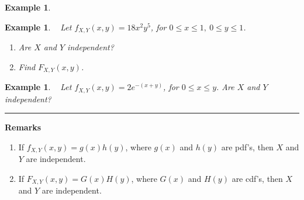 \documentclass[12pt]{amsart}
\newtheorem{example}[theorem]{Example}
\newcommand\pdfXY{f_{X,Y}(x,y)}
\newcommand\cdfXY{F_{X,Y}(x,y)}
\begin{document}
{\begin{example}
\begin{enumerate}
\end{enumerate}

\end{example}



\newpage

\begin{example}\ %
Let $\pdfXY = 18 x^2 y^5$, for $0 \leq x \leq 1, \ 0 \leq y \leq 1$.

\vspace{.5cm}

\begin{enumerate}
\item Are $X$ and $Y$ independent?
\vspace{10cm}



\item Find $\cdfXY$.
\vspace{6cm}

\end{enumerate}

\end{example}

\newpage

\begin{example}\ %
Let $\pdfXY = 2 e^{-(x+y)}$, for $0 \leq x \leq y$. \newline
Are $X$ and $Y$ independent?

\end{example}
\vspace{7cm}
\hrule
\vspace{.5cm}

\textbf{Remarks}
\begin{enumerate}
\item If $\pdfXY = g(x)h(y)$, where $g(x)$ and $h(y)$ are pdf's, then $X$ and $Y$ are independent.

\item If $\cdfXY = G(x)H(y)$, where $G(x)$ and $H(y)$ are cdf's, then $X$ and $Y$ are independent.
\vspace{6cm}

\end{enumerate}

\newpage

}  %
\end{document}

